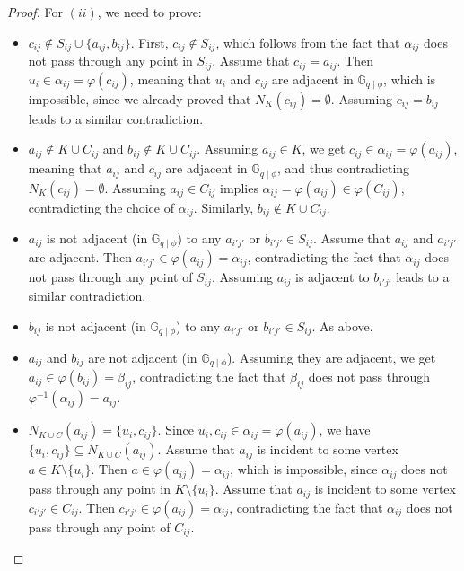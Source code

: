 \documentclass[10pt,a4paper]{article}
\newcommand{\Gphi}[1][q]{\mathbb{G}_{#1\mid\phi}}
\begin{document}
\begin{proof}
    \smallskip \noindent For  $(ii)$, we need to prove:
    \begin{itemize}
        \item $c_{ij} \not\in S_{ij} \cup \{a_{ij}, b_{ij}\}$. First, $c_{ij}\not\in S_{ij}$, which follows from the fact that $\alpha_{ij}$ does not pass through any point in $S_{ij}$. Assume that $c_{ij} = a_{ij}$.  Then $u_i \in \alpha_{ij} = \varphi(c_{ij})$,  meaning that $u_i$ and $c_{ij}$ are adjacent in $\Gphi$, which is impossible, since we already proved that $N_K(c_{ij})  = \emptyset$. Assuming $c_{ij} = b_{ij}$ leads to a similar contradiction.
        \item $a_{ij} \not\in K\cup C_{ij}$ and $b_{ij} \not\in K\cup C_{ij}$. Assuming $a_{ij}\in K$, we get $c_{ij} \in \alpha_{ij} = \varphi(a_{ij})$, meaning that $a_{ij}$ and $c_{ij}$ are adjacent in $\Gphi$, and thus contradicting $N_K(c_{ij})  = \emptyset$. Assuming $a_{ij}\in C_{ij}$ implies $\alpha_{ij} = \varphi(a_{ij}) \in \varphi(C_{ij})$, contradicting the choice of $\alpha_{ij}$. Similarly, $b_{ij} \not\in K\cup C_{ij}$.

        \item $a_{ij}$ is not adjacent (in $\Gphi$) to any $a_{i'j'}$ or $b_{i'j'}\in S_{ij}$. Assume that $a_{ij}$ and $a_{i'j'}$ are adjacent. Then $a_{i'j'} \in \varphi(a_{ij}) = \alpha_{ij}$, contradicting the fact that $\alpha_{ij}$ does not pass through any point of $S_{ij}$. Assuming $a_{ij}$ is adjacent to $b_{i'j'}$ leads to a similar contradiction.

        \item $b_{ij}$ is not adjacent (in $\Gphi$) to any $a_{i'j'}$ or $b_{i'j'}\in S_{ij}$. As above.

        \item $a_{ij}$ and $b_{ij}$ are not adjacent (in $\Gphi$). Assuming they are adjacent, we get $a_{ij} \in \varphi(b_{ij}) = \beta_{ij}$, contradicting the fact that $\beta_{ij}$ does not pass through $\varphi^{-1}(\alpha_{ij}) = a_{ij}$.

        \item $N_{K \cup C}(a_{ij}) = \{u_{i}, c_{ij}\}$. Since $u_i, c_{ij} \in \alpha_{ij} = \varphi(a_{ij})$, we have $\{u_{i}, c_{ij}\} \subseteq N_{K \cup C}(a_{ij})$. Assume that $a_{ij}$ is incident to some vertex $a\in K \setminus \{u_i\}$. Then $a\in \varphi(a_{ij}) = \alpha_{ij}$, which is impossible, since $\alpha_{ij}$ does not pass through any point in $K \setminus \{u_i\}$. Assume that $a_{ij}$ is incident to some vertex $c_{i'j'}\in C_{ij}$. Then $c_{i'j'} \in \varphi(a_{ij}) = \alpha_{ij}$, contradicting the fact that $\alpha_{ij}$ does not pass through any point of $C_{ij}$.


\end{itemize}
\end{proof}
\end{document}
